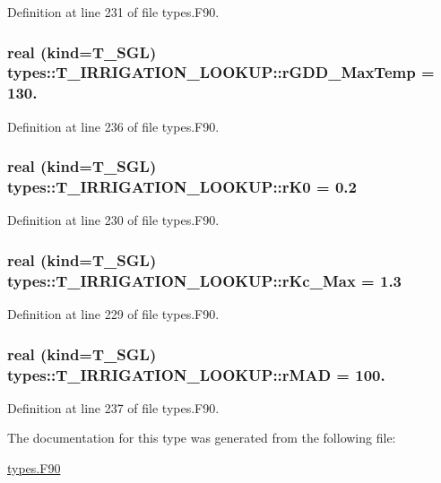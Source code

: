 Definition at line 231 of file types.F90.

\hypertarget{typetypes_1_1_t___i_r_r_i_g_a_t_i_o_n___l_o_o_k_u_p_a6d3f8f4cef4d393caa4b7b7bf78a94bc}{
\subsubsection[{rGDD\_\-MaxTemp}]{\setlength{\rightskip}{0pt plus 5cm}real (kind={\bf T\_\-SGL}) {\bf types::T\_\-IRRIGATION\_\-LOOKUP::rGDD\_\-MaxTemp} = 130.}}
\label{typetypes_1_1_t___i_r_r_i_g_a_t_i_o_n___l_o_o_k_u_p_a6d3f8f4cef4d393caa4b7b7bf78a94bc}


Definition at line 236 of file types.F90.

\hypertarget{typetypes_1_1_t___i_r_r_i_g_a_t_i_o_n___l_o_o_k_u_p_aa283531c1967fdba3d2f6c70f34694bf}{
\subsubsection[{rK0}]{\setlength{\rightskip}{0pt plus 5cm}real (kind={\bf T\_\-SGL}) {\bf types::T\_\-IRRIGATION\_\-LOOKUP::rK0} = 0.2}}
\label{typetypes_1_1_t___i_r_r_i_g_a_t_i_o_n___l_o_o_k_u_p_aa283531c1967fdba3d2f6c70f34694bf}


Definition at line 230 of file types.F90.

\hypertarget{typetypes_1_1_t___i_r_r_i_g_a_t_i_o_n___l_o_o_k_u_p_a7569770d20dbe6ed60daf9d5a3886c4a}{
\subsubsection[{rKc\_\-Max}]{\setlength{\rightskip}{0pt plus 5cm}real (kind={\bf T\_\-SGL}) {\bf types::T\_\-IRRIGATION\_\-LOOKUP::rKc\_\-Max} = 1.3}}
\label{typetypes_1_1_t___i_r_r_i_g_a_t_i_o_n___l_o_o_k_u_p_a7569770d20dbe6ed60daf9d5a3886c4a}


Definition at line 229 of file types.F90.

\hypertarget{typetypes_1_1_t___i_r_r_i_g_a_t_i_o_n___l_o_o_k_u_p_ac73562e07af876150ff86ff0232ce3d7}{
\subsubsection[{rMAD}]{\setlength{\rightskip}{0pt plus 5cm}real (kind={\bf T\_\-SGL}) {\bf types::T\_\-IRRIGATION\_\-LOOKUP::rMAD} = 100.}}
\label{typetypes_1_1_t___i_r_r_i_g_a_t_i_o_n___l_o_o_k_u_p_ac73562e07af876150ff86ff0232ce3d7}


Definition at line 237 of file types.F90.



The documentation for this type was generated from the following file:\begin{DoxyCompactItemize}
\item 
\hyperlink{types_8_f90}{types.F90}\end{DoxyCompactItemize}
